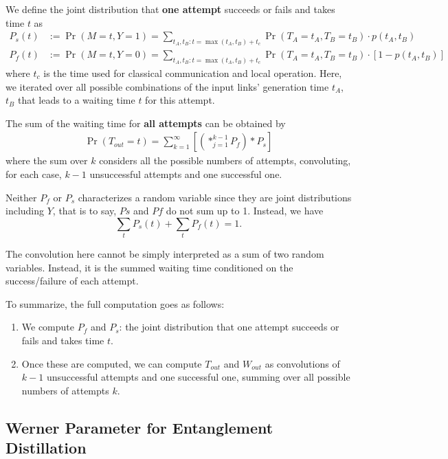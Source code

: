 \documentclass{masterthesis}
\begin{document}
We define the joint distribution that \textbf{one attempt} succeeds or fails and takes time $t$ as %
\begin{align}
    P_s(t) &:= \Pr(M = t, Y = 1) = \sum_{t_A, t_B : t = \max(t_A, t_B) + t_c} \Pr(T_A = t_A, T_B = t_B) \cdot p(t_A, t_B) \\
    P_f(t) &:= \Pr(M = t, Y = 0) = \sum_{t_A, t_B : t = \max(t_A, t_B) + t_c} \Pr(T_A = t_A, T_B = t_B) \cdot [1 - p(t_A, t_B)]
\end{align}
where $t_c$ is the time used for classical communication and local operation. Here, we iterated over all possible combinations of the input links' generation time $t_A$, $t_B$ that leads to a waiting time $t$ for this attempt.

The sum of the waiting time for \textbf{all attempts} can be obtained by
\begin{align}\label{eq:waiting_time_distillation}
    \Pr(T_{out} = t) = \sum_{k=1}^{\infty} \left[ \left( \ast_{j=1}^{k-1} P_f \right) \ast P_s \right]
\end{align}
where the sum over $k$ considers all the possible numbers of attempts, convoluting, for each case, $k-1$ unsuccessful attempts and one successful one.

Neither $P_f$ or $P_s$ characterizes a random variable since they are joint distributions including $Y$, that is to say, $Ps$ and $Pf$ do not sum up to 1. Instead, we have
\begin{equation}
    \sum_t P_s(t) + \sum_t P_f(t) = 1 .
\end{equation}

The convolution here cannot be simply interpreted as a sum of two random variables. Instead, it is the summed waiting time conditioned on the success/failure of each attempt.

To summarize, the full computation goes as follows:
\begin{enumerate}
    \item We compute $P_f$ and $P_s$: the joint distribution that one attempt succeeds or fails and takes time $t$.
    \item Once these are computed, we can compute $T_{out}$ and $W_{out}$ as convolutions of $k-1$ unsuccessful attempts and one successful one, summing over all possible numbers of attempts $k$.
\end{enumerate}

\subsection*{Werner Parameter for Entanglement Distillation}
\end{document}
